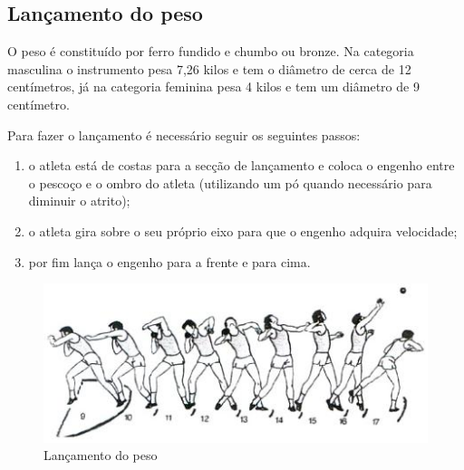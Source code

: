 \documentclass{report}
\begin{document}
    \subsection{Lançamento do peso}
    O peso é constituído por ferro fundido e chumbo ou bronze.
    Na categoria masculina o instrumento pesa 7,26 kilos e tem o diâmetro de cerca de 12 centímetros, já na categoria feminina pesa 4 kilos e tem um diâmetro de 9 centímetro.\par
    Para fazer o lançamento é necessário seguir os seguintes passos:
    \begin{enumerate}
        \item o atleta está de costas para a secção de lançamento e coloca o engenho entre o pescoço e o ombro do atleta (utilizando um pó quando necessário para diminuir o atrito);
        \item o atleta gira sobre o seu próprio eixo para que o engenho adquira velocidade;
        \item por fim lança o engenho para a frente e para cima.
    \end{enumerate}
    \cite{lancamentodopesodardo}
    
    \hfill \newline
     \FloatBarrier
            \begin{figure}[h]
            \center
            \includegraphics[scale=.5,angle=0]{peso.jpg}
            \caption{Lançamento do peso}
            \label{fig:peso.2}
            \end{figure}
    \FloatBarrier
    \hfill \newline
\end{document}
